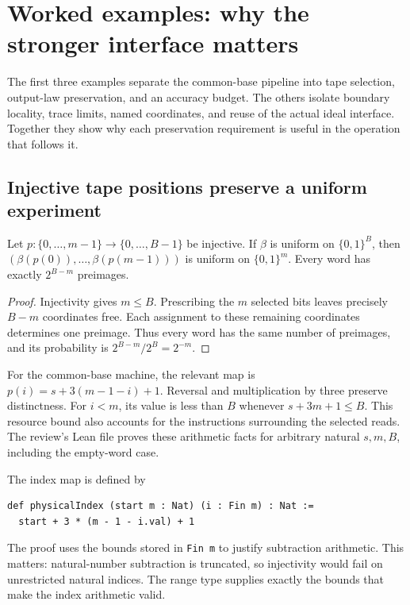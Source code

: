 \section{Worked examples: why the stronger interface matters}
\label{sec:worked}

The first three examples separate the common-base pipeline into tape selection, output-law preservation, and an accuracy budget. The others isolate boundary locality, trace limits, named coordinates, and reuse of the actual ideal interface. Together they show why each preservation requirement is useful in the operation that follows it.

\subsection{Injective tape positions preserve a uniform experiment}
\label{sec:tape-example}

\begin{samepage}
\begin{proposition}\label{prop:tape}
Let $p:\{0,\ldots,m-1\}\to\{0,\ldots,B-1\}$ be injective. If
$\beta$ is uniform on $\{0,1\}^B$, then
$(\beta(p(0)),\ldots,\beta(p(m-1)))$ is uniform on $\{0,1\}^m$.
Every word has exactly $2^{B-m}$ preimages.
\end{proposition}
\begin{proof}
Injectivity gives $m\leq B$. Prescribing the $m$ selected bits leaves precisely $B-m$ coordinates free. Each assignment to these remaining coordinates determines one
preimage. Thus every word has the same number of preimages, and its
probability is $2^{B-m}/2^B=2^{-m}$.
\end{proof}
\end{samepage}

For the common-base machine, the relevant map is
$p(i)=s+3(m-1-i)+1$. Reversal and multiplication by three preserve
distinctness. For $i<m$, its value is less than $B$ whenever
$s+3m+1\leq B$. This resource bound also accounts for the instructions surrounding the selected reads.
The review's Lean file proves these arithmetic facts for arbitrary natural
$s,m,B$, including the empty-word case.

The index map is defined by
\begin{lstlisting}[caption={Lean definition of the physical tape index.},label={lst:physical-index}]
def physicalIndex (start m : Nat) (i : Fin m) : Nat :=
  start + 3 * (m - 1 - i.val) + 1
\end{lstlisting}
The proof uses the bounds stored in \texttt{Fin m} to justify subtraction
arithmetic. This matters: natural-number subtraction is truncated, so
injectivity would fail on unrestricted natural indices. The range type supplies exactly the bounds that make the index arithmetic valid.

